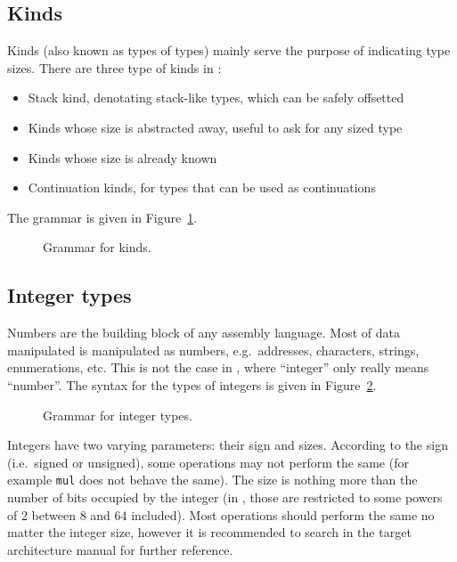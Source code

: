 \subsection{Kinds}\label{subsec:nstar-common-ts-kinds}

Kinds (also known as types of types) mainly serve the purpose of indicating type sizes.
There are three type of kinds in \nstar:
\begin{itemize}
	\item Stack kind, denotating stack-like types, which can be safely offsetted
	\item Kinds whose size is abstracted away, useful to ask for any sized type
	\item Kinds whose size is already known
	\item Continuation kinds, for types that can be used as continuations
\end{itemize}
The grammar is given in Figure~\ref{fig:nstar-common-ts-kinds-syntax}.

\begin{figure}[htb]
	\centering
	\caption{Grammar for kinds.}
	\label{fig:nstar-common-ts-kinds-syntax}
\end{figure}

\subsection{Integer types}\label{subsec:nstar-common-ts-integer}

Numbers are the building block of any assembly language. Most of data manipulated is manipulated as numbers, e.g.\ addresses, characters, strings, enumerations, etc.
This is not the case in \nstar, where ``integer''  only really means ``number''.
The syntax for the types of integers is given in Figure~\ref{fig:nstar-common-ts-integer-syntax}.

\begin{figure}[htb]
	\centering
	\caption{Grammar for integer types.}
	\label{fig:nstar-common-ts-integer-syntax}
\end{figure}

Integers have two varying parameters: their sign and sizes.
According to the sign (i.e.\ signed or unsigned), some operations may not perform the same (for example \texttt{mul} does not behave the same).
The size is nothing more than the number of bits occupied by the integer (in \nstar, those are restricted to some powers of 2 between $8$ and $64$ included).
Most operations should perform the same no matter the integer size, however it is recommended to search in the target architecture manual for further reference.

